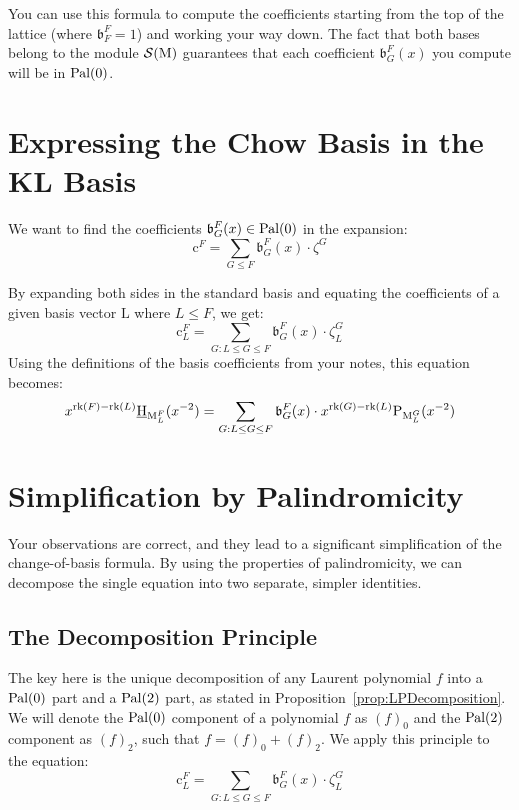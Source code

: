 \documentclass[11pt]{article}
\newcommand{\calS}{\mathcal{S}}
\newcommand{\chow}{\normalfont\text{\underline{H}}}
\newcommand{\klpoly}{\normalfont\text{P}}
\newcommand{\rank}{\normalfont\text{rk}}
\newcommand{\M}{\normalfont\text{M}}
\newcommand{\Ebasis}[1]{\mathrm{#1}}
\newcommand{\Cbasis}[1]{\mathrm{c}^{#1}}
\newcommand{\CbasisSub}[2]{\mathrm{c}^{#1}_{#2}}
\newcommand{\Zbasis}[1]{\zeta^{#1}}
\newcommand{\ZbasisSub}[2]{\zeta^{#1}_{#2}}
\newcommand{\Ibasis}[2]{\mathfrak{b}^{#1}_{#2}}
\newcommand{\pal}{\normalfont\text{Pal}}
\newcommand{\palcomp}[2]{\left(#1\right)_{#2}}
\theoremstyle{remark}
\begin{document}
You can use this formula to compute the coefficients starting from the top of the lattice (where $\Ibasis{F}{F}=1$) and working your way down. The fact that both bases belong to the module $\calS(\M)$ guarantees that each coefficient $\Ibasis{F}{G}(x)$ you compute will be in $\pal(0)$.

\section*{Expressing the Chow Basis in the KL Basis}
We want to find the coefficients $\Ibasis{F}{G}(x) \in \pal(0)$ in the expansion:
\[
    \Cbasis{F} = \sum_{G \le F} \Ibasis{F}{G}(x) \cdot \Zbasis{G}
\]

By expanding both sides in the standard basis and equating the coefficients of a given basis vector $\Ebasis{L}$ where $L \le F$, we get:
\[
    \CbasisSub{F}{L} = \sum_{G: L \le G \le F} \Ibasis{F}{G}(x) \cdot \ZbasisSub{G}{L}
\]
Using the definitions of the basis coefficients from your notes, this equation becomes:
\[
    x^{\rank(F)-\rank(L)} \chow_{\M_L^F}(x^{-2}) = \sum_{G: L \le G \le F} \Ibasis{F}{G}(x) \cdot x^{\rank(G)-\rank(L)} \klpoly_{\M_L^G}(x^{-2})
\]


\section{Simplification by Palindromicity}

Your observations are correct, and they lead to a significant simplification of the change-of-basis formula. By using the properties of palindromicity, we can decompose the single equation into two separate, simpler identities.

\subsection{The Decomposition Principle}
The key here is the unique decomposition of any Laurent polynomial $f$ into a $\pal(0)$ part and a $\pal(2)$ part, as stated in Proposition~\ref{prop:LPDecomposition}. We will denote the $\pal(0)$ component of a polynomial $f$ as $\palcomp{f}{0}$ and the $\pal(2)$ component as $\palcomp{f}{2}$, such that $f = \palcomp{f}{0} + \palcomp{f}{2}$. We apply this principle to the equation:
\[
    \CbasisSub{F}{L} = \sum_{G: L \le G \le F} \Ibasis{F}{G}(x) \cdot \ZbasisSub{G}{L}
\]
\end{document}
